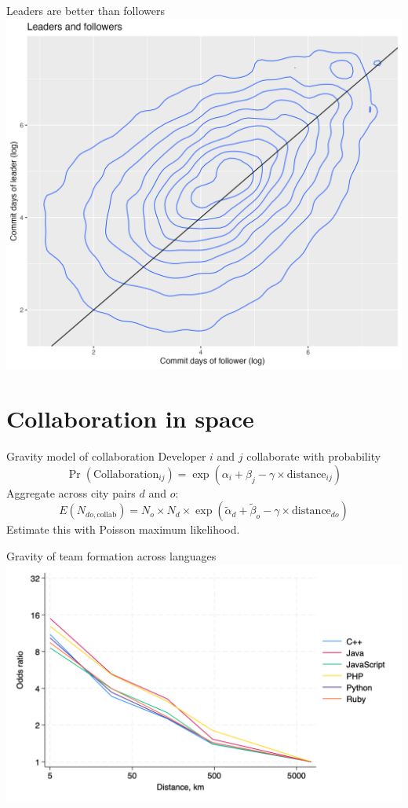 \documentclass[
  ignorenonframetext,
  aspectratio=169,
]{beamer}
\begin{document}
\begin{frame}{Leaders are better than followers}
\protect\hypertarget{leaders-are-better-than-followers}{}
\includegraphics{figures/quality_scatter.png}
\end{frame}

\section{Collaboration in space}\label{collaboration-in-space}

\begin{frame}{Gravity model of collaboration}
\protect\hypertarget{gravity-model-of-collaboration}{}
Developer \(i\) and \(j\) collaborate with probability \[
\Pr(\text{Collaboration}_{ij}) = \exp(\alpha_i + \beta_j -\gamma\times\text{distance}_{ij})
\] Aggregate across city pairs \(d\) and \(o\): \[
E(N_{do,\text{collab}}) = N_o\times N_d\times\exp(\tilde\alpha_d + \tilde\beta_o -\gamma\times\text{distance}_{do})
\] Estimate this with Poisson maximum likelihood.
\end{frame}

\begin{frame}{Gravity of team formation across languages}
\protect\hypertarget{gravity-of-team-formation-across-languages}{}
\includegraphics{figures/commits_by_language.png}
\end{frame}
\end{document}
